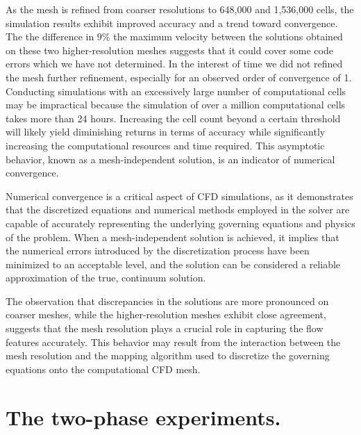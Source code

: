 As the mesh is refined from coarser resolutions to 648,000 and 1,536,000 cells, the simulation results exhibit improved accuracy and a trend toward convergence. The the difference in $9$\% the maximum velocity between the solutions obtained on these two higher-resolution meshes suggests that it could cover some code errors which we have not determined. In the interest of time we did not refined the mesh further refinement, especially for an observed order of convergence of 1. Conducting simulations with an excessively large number of computational cells may be impractical because the simulation of over a million computational cells takes more than 24 hours. Increasing the cell count beyond a certain threshold will likely yield diminishing returns in terms of accuracy while significantly increasing the computational resources and time required. This asymptotic behavior, known as a mesh-independent solution, is an indicator of numerical convergence.

Numerical convergence is a critical aspect of CFD simulations, as it demonstrates that the discretized equations and numerical methods employed in the solver are capable of accurately representing the underlying governing equations and physics of the problem. When a mesh-independent solution is achieved, it implies that the numerical errors introduced by the discretization process have been minimized to an acceptable level, and the solution can be considered a reliable approximation of the true, continuum solution.

The observation that discrepancies in the solutions are more pronounced on coarser meshes, while the higher-resolution meshes exhibit close agreement, suggests that the mesh resolution plays a crucial role in capturing the flow features accurately. This behavior may result from the interaction between the mesh resolution and the mapping algorithm used to discretize the governing equations onto the computational CFD mesh. 


\section{The two-phase experiments.}

